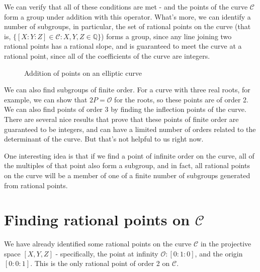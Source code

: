 \documentclass{article}
\begin{document}
We can verify that all of these conditions are met - and the points of the curve $\mathcal{C}$ form
a group under addition with this operator. What's more, we can identify a number of subgroups, in
particular, the set of rational points on the curve (that is,
$\{[X:Y:Z] \in \mathcal{C} : X,Y,Z \in \mathbb{Q}\}$) forms a group, since any line joining two rational
points has a rational slope, and is guaranteed to meet the curve at a rational point, since all of the
coefficients of the curve are integers.

\begin{figure}[htb]
	\caption{Addition of points on an elliptic curve}
	\label{fig:ecc_addition}
\end{figure}


We can also find subgroups of finite order. For a curve with three real roots, for example, we can show
that $2P = \mathcal{O}$ for the roots, so these points are of order 2. We can also find points of order
3 by finding the inflection points of the curve. There are several nice results that prove that these
points of finite order are guaranteed to be integers, and can have a limited number of orders related to
the determinant of the curve. But that's not helpful to us right now.

One interesting idea is that if we find a point of infinite order on the curve, all of the multiples of
that point also form a subgroup, and in fact, all rational points on the curve will be a member of one of
a finite number of subgroups generated from rational points.

\section{Finding rational points on $\mathcal{C}$}

We have already identified some rational points on the curve $\mathcal{C}$ in the projective space
$[X,Y,Z]$ - specifically, the point at infinity $\mathcal{O}: [0:1:0]$, and the origin $[0:0:1]$. This is
the only rational point of order 2 on $\mathcal{C}$.
\end{document}

